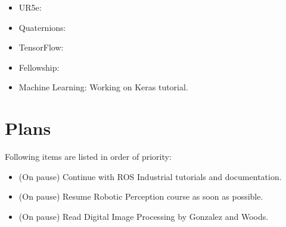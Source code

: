 \documentclass[11pt]{article}
\begin{document}
\begin{itemize}
	\item UR5e:

	\item Quaternions:

	\item TensorFlow:

	\item Fellowship:

	\item Machine Learning: Working on Keras tutorial.




\end{itemize}

\newpage

\section{Plans}
Following items are listed in order of priority:

\begin{itemize}

	\item (On pause) Continue with ROS Industrial tutorials and documentation.

	\item (On pause) Resume Robotic Perception course as soon as possible.

	\item (On pause) Read Digital Image Processing by Gonzalez and Woods.

\end{itemize}



\newpage


\end{document}
